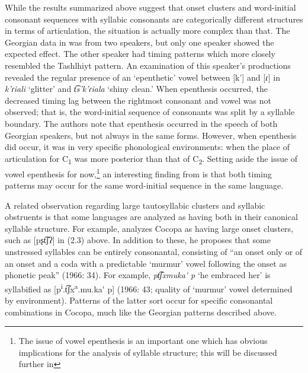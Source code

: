   While the results summarized above suggest that onset clusters and word-initial consonant sequences with syllabic consonants are categorically different structures in terms of articulation, the situation is actually more complex than that. The Georgian data in \citet{GoldsteinEtAl2007} was from two speakers, but only one speaker showed the expected effect. The other speaker had timing patterns which more closely resembled the Tashlhiyt pattern. An examination of this speaker’s productions revealed the regular presence of an ‘epenthetic’ vowel between [k’] and [ɾ] in \textit{k'ɾiali} ‘glitter’ and \textit{t͡s’k’ɾiala} ‘shiny clean.’ When epenthesis occurred, the decreased timing lag between the rightmost consonant and vowel was not observed; that is, the word-initial sequence of consonants was split by a syllable boundary. The authors note that epenthesis occurred in the speech of both Georgian speakers, but not always in the same forms. However, when epenthesis did occur, it was in very specific phonological environments: when the place of articulation for C\textsubscript{1} was more posterior than that of C\textsubscript{2}. Setting aside the issue of vowel epenthesis for now,\footnote{ \textrm{The issue of vowel epenthesis is an important one which has obvious implications for the analysis of syllable structure; this will be discussed further in }} an interesting finding from \citet{GoldsteinEtAl2007} is that both timing patterns may occur for the same word-initial sequence in the same language.

  A related observation regarding large tautosyllabic clusters and syllabic obstruents is that some languages are analyzed as having both in their canonical syllable structure. For example, \citet{Crawford1966} analyzes Cocopa as having large onset clusters, such as [pʂt͡ʃʔ] in (2.3) above. In addition to these, he proposes that some unstressed syllables can be entirely consonantal, consisting of “an onset only or of an onset and a coda with a predictable ‘murmur’ vowel following the onset as phonetic peak” (1966: 34). For example, \textit{pt͡ʃxmuka\'{} p} ‘he embraced her’ is syllabified as [p\textsuperscript{i}.t͡ʃx\textsuperscript{a}.mu.ka\'{} p] (1966: 43; quality of ‘murmur’ vowel determined by environment). Patterns of the latter sort occur for specific consonantal combinations in Cocopa, much like the Georgian patterns described above. 

